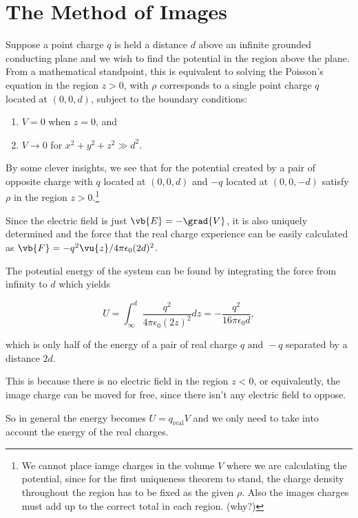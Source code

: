 \documentclass[english,a4paper,12pt]{report}
\begin{document}
\section{The Method of Images}

Suppose a point charge \(q\) is held a distance \(d\) above an infinite grounded conducting plane and we wish to find the potential in the region above the plane. From a mathematical standpoint, this is equivalent to solving the Poisson's equation in the region \(z > 0\), with \(\rho \) corresponds to a single point charge  \(q\) located at \((0,0,d )\), subject to the boundary conditions: 
\begin{enumerate}
    \item \(V = 0\) when \(z = 0\), and \item \(V \rightarrow 0\) for \(x^2 + y^2 + z^2 \gg d^2\).	
\end{enumerate}

By some clever insights, we see that for the potential created by a pair of opposite charge with \(q\) located at \((0,0,d)\) and \(-q\) located at \((0,0,-d)\) satisfy \(\rho \) in the region \(z > 0\).\footnote{We cannot place iamge charges in the volume \(V\) where we are calculating the potential, since for the first uniqueness theorem to stand, the charge density throughout the region has to be fixed as the given \(\rho \). Also the images charges must add up to the correct total in each region. (why?)} 

Since the electric field is just \(\vb{E} = -\grad{V} \), it is also uniquely determined and the force that the real charge experience can be easily calculated as \( \vb{F} = -q^2\vu{z}/ 4\pi \epsilon_0 (2d)^2\).

The potential energy of the system can be found by integrating the force from infinity to \(d\) which yields 

\begin{equation}
    U = \int_{\infty}^{d}  \frac{q^2}{4\pi \epsilon _{0} (2z)^2} dz = -\frac{q^2}{16\pi \epsilon _{0} d} ,
\end{equation}

which is only half of the energy of a pair of real charge \(q \text{ and }  -q\) separated by a distance \(2d\). 

This is because there is no electric field in the region \(z < 0\), or equivalently, the image charge can be moved for free, since there isn't any electric field to oppose. 

So in general the energy becomes \(U = q_{\text{real} } V \) and we only need to take into account the energy of the real charges. 
\end{document}
